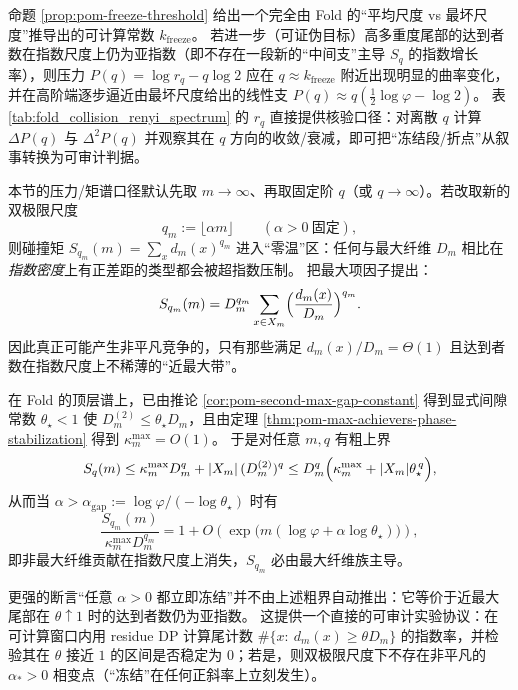 \begin{remark}\label{rem:pom-freeze-prediction}
命题 \ref{prop:pom-freeze-threshold} 给出一个完全由 Fold 的“平均尺度 vs 最坏尺度”推导出的可计算常数 \(k_{\mathrm{freeze}}\)。
若进一步（可证伪目标）高多重度尾部的达到者数在指数尺度上仍为亚指数（即不存在一段新的“中间支”主导 \(S_q\) 的指数增长率），则压力
\(
P(q)=\log r_q-q\log2
\)
应在 \(q\approx k_{\mathrm{freeze}}\) 附近出现明显的曲率变化，并在高阶端逐步逼近由最坏尺度给出的线性支
\(
P(q)\approx q(\tfrac12\log\varphi-\log2)
\)。
表 \ref{tab:fold_collision_renyi_spectrum} 的 \(r_q\) 直接提供核验口径：对离散 \(q\) 计算 \(\Delta P(q)\) 与 \(\Delta^2P(q)\) 并观察其在 \(q\) 方向的收敛/衰减，即可把“冻结段/折点”从叙事转换为可审计判据。
\end{remark}

\begin{remark}[双极限尺度 $q=\alpha m$：立即冻结与可审计判据]\label{rem:pom-q-alpha-m-freeze}
本节的压力/矩谱口径默认先取 $m\to\infty$、再取固定阶 $q$（或 $q\to\infty$）。若改取新的双极限尺度
\[
q_m:=\lfloor \alpha m\rfloor\qquad(\alpha>0\ \text{固定}),
\]
则碰撞矩
\(
S_{q_m}(m)=\sum_x d_m(x)^{q_m}
\)
进入“零温”区：任何与最大纤维 \(D_m\) 相比在\emph{指数密度}上有正差距的类型都会被超指数压制。
把最大项因子提出：
\[
S_{q_m}(m)
=D_m^{q_m}\sum_{x\in X_m}\Bigl(\frac{d_m(x)}{D_m}\Bigr)^{q_m}.
\]
因此真正可能产生非平凡竞争的，只有那些满足 \(d_m(x)/D_m=\Theta(1)\) 且达到者数在指数尺度上不稀薄的“近最大带”。
\par
在 Fold 的顶层谱上，已由推论 \ref{cor:pom-second-max-gap-constant} 得到显式间隙常数 \(\theta_\star<1\) 使
\(
D_m^{(2)}\le \theta_\star D_m
\)，且由定理 \ref{thm:pom-max-achievers-phase-stabilization} 得到 \(\kappa_m^{\mathrm{max}}=O(1)\)。
于是对任意 \(m,q\) 有粗上界
\[
S_q(m)\le \kappa_m^{\mathrm{max}}D_m^q+|X_m|\,(D_m^{(2)})^q
\le D_m^q\Bigl(\kappa_m^{\mathrm{max}}+|X_m|\theta_\star^{\,q}\Bigr),
\]
从而当 \(\alpha>\alpha_{\mathrm{gap}}:=\log\varphi/(-\log\theta_\star)\) 时有
\[
\frac{S_{q_m}(m)}{\kappa_m^{\mathrm{max}}D_m^{q_m}}=1+O\!\left(\exp\!\bigl(m(\log\varphi+\alpha\log\theta_\star)\bigr)\right),
\]
即非最大纤维贡献在指数尺度上消失，$S_{q_m}$ 必由最大纤维族主导。
\par
更强的断言“任意 \(\alpha>0\) 都立即冻结”并不由上述粗界自动推出：它等价于近最大尾部在 $\theta\uparrow 1$ 时的达到者数仍为亚指数。
这提供一个直接的可审计实验协议：在可计算窗口内用 residue DP 计算尾计数
\(
\#\{x:\ d_m(x)\ge \theta D_m\}
\)
的指数率，并检验其在 $\theta$ 接近 $1$ 的区间是否稳定为 $0$；若是，则双极限尺度下不存在非平凡的 \(\alpha_\ast>0\) 相变点（“冻结”在任何正斜率上立刻发生）。
\end{remark}

